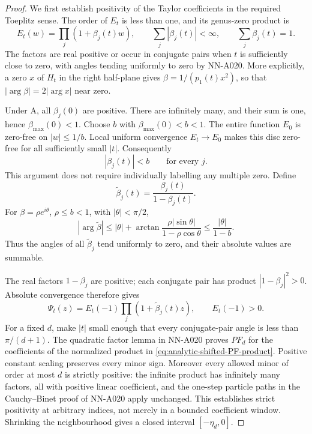 \begin{proof}
We first establish positivity of the Taylor coefficients in the
required Toeplitz sense. The order of $E_t$ is less than one, and its
genus-zero product is
\[
 E_t(w)=\prod_j(1+\beta_j(t)w),\qquad
 \sum_j|\beta_j(t)|<\infty,\qquad
 \sum_j\beta_j(t)=1.
\]
The factors are real positive or occur in conjugate pairs when
$t$ is sufficiently close to zero, with angles tending uniformly
to zero by NN-A020. More explicitly, a zero $x$ of $H_t$ in the
right half-plane gives $\beta=1/(p_1(t)x^2)$, so that
$|\arg\beta|=2|\arg x|$ near zero.

Under A, all $\beta_j(0)$ are positive. There are infinitely many,
and their sum is one, hence $\beta_{\max}(0)<1$. Choose
$b$ with $\beta_{\max}(0)<b<1$. The entire function $E_0$ is
zero-free on $|w|\le1/b$. Local uniform convergence
$E_t\to E_0$ makes this disc zero-free for all sufficiently small
$|t|$. Consequently
\begin{equation}\label{eq:analytic-unitary-beta-bound}
                |\beta_j(t)|<b\qquad\text{for every }j.
\end{equation}
This argument does not require individually labelling any multiple
zero. Define
\[
       \widetilde\beta_j(t)=\frac{\beta_j(t)}{1-\beta_j(t)}.
\]
For $\beta=\rho e^{i\theta}$, $\rho\le b<1$, with $|\theta|<\pi/2$,
\[
 |\arg\widetilde\beta|
 \le |\theta|+
       \arctan\frac{\rho|\sin\theta|}{1-\rho\cos\theta}
 \le \frac{|\theta|}{1-b}.
\]
Thus the angles of all $\widetilde\beta_j$ tend uniformly to zero,
and their absolute values are summable.

The real factors $1-\beta_j$ are positive; each conjugate pair
has product $|1-\beta_j|^2>0$. Absolute convergence therefore gives
\begin{equation}\label{eq:analytic-shifted-PF-product}
 \Psi_t(z)=E_t(-1)\prod_j(1+\widetilde\beta_j(t)z),
                  \qquad E_t(-1)>0.
\end{equation}
For a fixed $d$, make $|t|$ small enough that every conjugate-pair
angle is less than $\pi/(d+1)$. The quadratic factor lemma in
NN-A020 proves $PF_d$ for the coefficients of the normalized
product in \eqref{eq:analytic-shifted-PF-product}. Positive
constant scaling preserves every minor sign. Moreover every
allowed minor of order at most $d$ is strictly positive: the
infinite product has infinitely many factors, all with positive
linear coefficient, and the one-step particle paths in the
Cauchy--Binet proof of NN-A020 apply unchanged. This establishes
strict positivity at arbitrary indices, not merely in a bounded
coefficient window. Shrinking the neighbourhood gives a closed
interval $[-\eta_d,0]$.


\end{proof}
